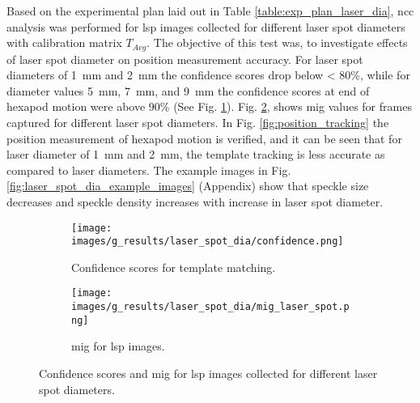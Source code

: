     Based on the experimental plan laid out in Table \ref{table:exp_plan_laser_dia}, \gls{ncc} analysis was performed for \gls{lsp} images collected for different laser spot diameters with calibration matrix $T_{Avg}$. The objective of this test was, to investigate effects of laser spot diameter on position measurement accuracy. For laser spot diameters of \SI{1}{\milli\meter} and \SI{2}{\milli\meter} the confidence scores drop below < 80\%, while for diameter values \SI{5}{\milli\meter}, \SI{7}{\milli\meter}, and \SI{9}{\milli\meter} the confidence scores at end of hexapod motion were above 90\% (See Fig. \ref{subfig:laser_spot_dia/confidence.png}). Fig. \ref{subfig:laser_spot_dia/mig_laser_spot.png}, shows \gls{mig} values for frames captured for different laser spot diameters. In Fig. \ref{fig:position_tracking} the position measurement of hexapod motion is verified, and it can be seen that for laser diameter of \SI{1}{\milli\meter} and \SI{2}{\milli\meter}, the template tracking is less accurate as compared to laser diameters. The example images in Fig. \ref{fig:laser_spot_dia_example_images} (Appendix) show that speckle size decreases and speckle density increases with increase in laser spot diameter.

    \begin{figure}[ht]
        \centering
        \begin{subfigure}[b]{0.65\textwidth}
            \centering
            \texttt{[image: images/g\_results/laser\_spot\_dia/confidence.png]}
            \caption{Confidence scores for template matching.}
            \label{subfig:laser_spot_dia/confidence.png}
        \end{subfigure}

        \vspace{3mm}
        
        \begin{subfigure}[b]{0.65\textwidth}
            \centering
            \texttt{[image: images/g\_results/laser\_spot\_dia/mig\_laser\_spot.png]}
            \caption{\gls{mig} for \gls{lsp} images.}
            \label{subfig:laser_spot_dia/mig_laser_spot.png}
        \end{subfigure} 
        \caption{Confidence scores and \gls{mig} for \gls{lsp} images collected for different laser spot diameters.}
        \label{fig:laser_spot_dia_results}
    \end{figure}
    
